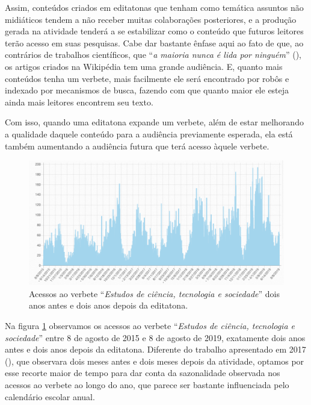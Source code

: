 Assim, conteúdos criados em editatonas que tenham como temática assuntos não midiáticos tendem a não receber muitas colaborações posteriores, e a produção gerada na atividade tenderá a se estabilizar como o conteúdo que futuros leitores terão acesso em suas pesquisas. Cabe dar bastante ênfase aqui ao fato de que, ao contrários de trabalhos científicos, que ``\textit{a maioria nunca é lida por ninguém}'' (\cite[p.59]{latour_ciencia_1987}), os artigos criados na Wikipédia tem uma grande audiência. E, quanto mais conteúdos tenha um verbete, mais facilmente ele será encontrado por robôs e indexado por mecanismos de busca, fazendo com que quanto maior ele esteja ainda mais leitores encontrem seu texto.

Com isso, quando uma editatona expande um verbete, além de estar melhorando a qualidade daquele conteúdo para a audiência previamente esperada, ela está também aumentando a audiência futura que terá acesso àquele verbete.

\begin{figure}[H]
    \centering
    \includegraphics[width=1\textwidth]{Images/acessos-estudos-cts.png}
    \caption{Acessos ao verbete ``\textit{Estudos de ciência, tecnologia e sociedade}'' dois anos antes e dois anos depois da editatona.}
    \label{fig:acessos-estudos-cts}
\end{figure}

Na figura \ref{fig:acessos-estudos-cts} observamos os acessos ao verbete ``\textit{Estudos de ciência, tecnologia e sociedade}'' entre 8 de agosto de 2015 e 8 de agosto de 2019, exatamente dois anos antes e dois anos depois da editatona. Diferente do trabalho apresentado em 2017 (\cite{andrade_historias_2017}), que observara dois meses antes e dois meses depois da atividade, optamos por esse recorte maior de tempo para dar conta da sazonalidade observada nos acessos ao verbete ao longo do ano, que parece ser bastante influenciada pelo calendário escolar anual.

